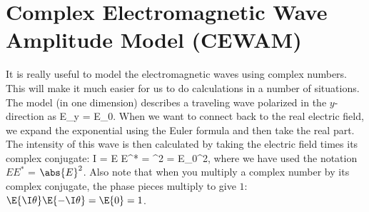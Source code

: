 \section{Complex Electromagnetic Wave Amplitude Model (CEWAM)}
\label{sec:CEWAM}
It is really useful to model the electromagnetic waves using complex numbers. This will make it much easier for us to do calculations in a number of situations. The model (in one dimension) describes a traveling wave polarized in the $y$-direction as
\beq
E_y = E_0.
\label{eq:CEWAM}
\eeq
When we want to connect back to the real electric field, we expand the exponential using the Euler formula and then take the real part. The intensity of this wave is then calculated by taking the electric field times its complex conjugate:
\beq
I = E E^* = ^2 = E_0^2,
\label{eq:CEWAMInt}
\eeq
where we have used the notation $EE^*$ = $\abs{E}^2$. Also note that when you multiply a complex number by its complex conjugate, the phase pieces multiply to give $1$: $\E{\I\theta}\E{-\I\theta}=\E{0}=1$.


